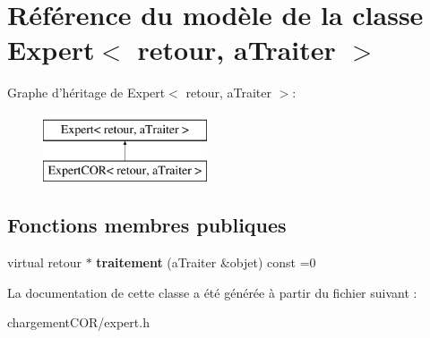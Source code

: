 \hypertarget{class_expert}{\section{Référence du modèle de la classe Expert$<$ retour, a\+Traiter $>$}
\label{class_expert}
}
Graphe d'héritage de Expert$<$ retour, a\+Traiter $>$\+:\begin{figure}[H]
\begin{center}
\leavevmode
\includegraphics[height=2.000000cm]{class_expert}
\end{center}
\end{figure}
\subsection*{Fonctions membres publiques}
\begin{DoxyCompactItemize}
\item 
\hypertarget{class_expert_a87f345eef673e757f63bfa553c9525a1}{virtual retour $\ast$ {\bfseries traitement} (a\+Traiter \&objet) const =0}\label{class_expert_a87f345eef673e757f63bfa553c9525a1}

\end{DoxyCompactItemize}


La documentation de cette classe a été générée à partir du fichier suivant \+:\begin{DoxyCompactItemize}
\item 
chargement\+C\+O\+R/expert.\+h\end{DoxyCompactItemize}

